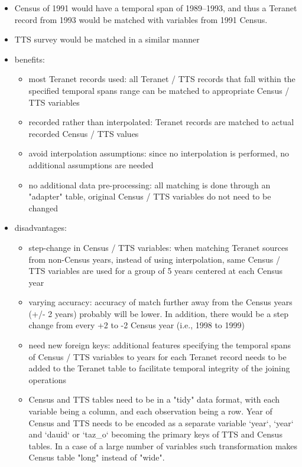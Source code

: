\begin{enumerate}
\begin{itemize}
        \item Census of 1991 would have a temporal span of 1989--1993, and thus a Teranet record from 1993 would be matched with variables from 1991 Census.
        \item TTS survey would be matched in a similar manner
        \item benefits:
        \begin{itemize}
            \item most Teranet records used: all Teranet / TTS records that fall within the specified temporal spans range can be matched to appropriate Census / TTS variables
            \item recorded rather than interpolated: Teranet records are matched to actual recorded Census / TTS values
            \item avoid interpolation assumptions: since no interpolation is performed, no additional assumptions are needed
            \item no additional data pre-processing: all matching is done through an "adapter" table, original Census / TTS variables do not need to be changed
        \end{itemize}
        \item disadvantages:
        \begin{itemize}
            \item step-change in Census / TTS variables: when matching Teranet sources from non-Census years, instead of using interpolation, same Census / TTS variables are used for a group of 5 years centered at each Census year
            \item varying accuracy: accuracy of match further away from the Census years (+/- 2 years) probably will be lower.
            In addition, there would be a step change from every +2 to -2 Census year (i.e., 1998 to 1999)
            \item need new foreign keys: additional features specifying the temporal spans of Census / TTS variables to years for each Teranet record needs to be added to the Teranet table to facilitate temporal integrity of the joining operations
            \item Census and TTS tables need to be in a "tidy" data format, with each variable being a column, and each observation being a row.
            Year of Census and TTS needs to be encoded as a separate variable `year`, `year` and `dauid` or `taz\_o` becoming the primary keys of TTS and Census tables.
            In a case of a large number of variables such transformation makes Census table "long" instead of "wide".
        \end{itemize}
    \end{itemize}
\end{enumerate}


